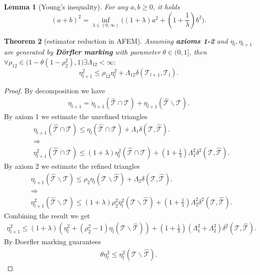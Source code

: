 \documentclass[a4paper,12pt,oneside,fleqn]{book}
\newtheorem{theorem}{Theorem}[section]
\newtheorem{lemma}[theorem]{Lemma}
\theoremstyle{definition}
\theoremstyle{remark}
\begin{document}
\begin{lemma}[Young's inequality]
	For any $a , b \ge 0$, it holds
	\begin{equation}
		(a + b)^2 = \inf_{\lambda \in (0, \infty)} \bigg((1 + \lambda) a^2 + (1 + \frac{1}{\lambda})b^2 \bigg). 
	\end{equation}
\end{lemma}






\begin{theorem}[estimator reduction in AFEM]
Assuming \textbf{axioms 1-2} and $\eta_l, \eta_{l + 1}$ are generated by \textbf{D\"orfler marking} with parameter $\theta \in (0, 1] $, then $\forall \rho_{12} \in \bigg(1 - \theta(1 - \rho_2^2), 1 \bigg) \exists \Lambda_{12}< \infty: $
\begin{equation}
	\eta_{l +1}^2 \le \rho_{12} \eta_l^2 + \Lambda_{12} \delta(\mathcal{T}_{l + 1}, \mathcal{T}_l). 
\end{equation}
\end{theorem}
\begin{proof}
	By decomposition we have
	\begin{align*}
		\eta_{l+1} = \eta_{l+1}(\hat{\mathcal{T}} \cap \mathcal{T}) + \eta_{l + 1}(\hat{\mathcal{T}} \backslash \mathcal{T}).
	\end{align*}
	By axiom 1 we estimate the unrefined triangles
	\begin{align*}
		&\eta_{l + 1}(\hat{\mathcal{T}}\cap \mathcal{T}) \le \eta_l (\hat{\mathcal{T}} \cap \mathcal{T}) + \Lambda_1\delta(\mathcal{T}, \hat{\mathcal{T}}).\\
		&\Rightarrow\\
		&\eta_{l + 1}^2(\hat{\mathcal{T}} \cap \mathcal{T}) \le (1 + \lambda) \eta_l^2 (\hat{\mathcal{T}} \cap \mathcal{T}) + ( 1 + \frac{1}{\lambda}) \Lambda_1^2 \delta^2(\mathcal{T}, \hat{\mathcal{T}}). 
	\end{align*}
	By axiom 2 we estimate the refined triangles 
	\begin{align*}
		&\eta_{l + 1}(\hat{\mathcal{T}} \backslash \mathcal{T}) \le \rho_2 \eta_l(\mathcal{T} \backslash \hat{\mathcal{T}}) + \Lambda_2 \delta(\mathcal{T}, \hat{\mathcal{T}}).\\
		&\Rightarrow\\
		& \eta_{l + 1}^2(\hat{\mathcal{T}} \backslash \mathcal{T}) \le (1 + \lambda) \rho_2^2 \eta_l^2(\mathcal{T}\backslash \hat{\mathcal{T}}) + (1 + \frac{1}{\lambda}) \Lambda_2^2 \delta^2(\mathcal{T}, \hat{\mathcal{T}}). 
	\end{align*}
	Combining the result we get
	\begin{align*}
		\eta_{l + 1}^2 \le (1 + \lambda)( \eta_l^2 + (\rho_2^2 - 1) \eta_l(\mathcal{T} \backslash \hat{\mathcal{T}})) + (1 + \frac{1}{\lambda})(\Lambda_1^2 + \Lambda_2^2) \delta^2 (\mathcal{T}, \hat{\mathcal{T}}).
	\end{align*}
	By Doerfler marking guarantees 
	\begin{align*}
		\theta \eta_l^2 \le \eta_l^2(\mathcal{T} \backslash \hat{\mathcal{T}}).
	\end{align*}
\end{proof}
\end{document}
